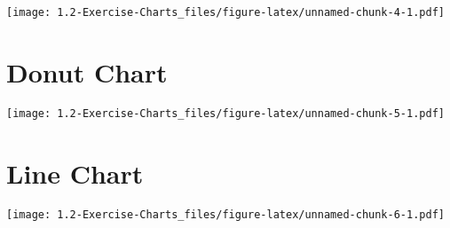 \documentclass[
]{article}
\begin{document}
\texttt{[image: 1.2-Exercise-Charts\_files/figure-latex/unnamed-chunk-4-1.pdf]}

\hypertarget{donut-chart}{%
\section{Donut Chart}\label{donut-chart}}

\texttt{[image: 1.2-Exercise-Charts\_files/figure-latex/unnamed-chunk-5-1.pdf]}

\hypertarget{line-chart}{%
\section{Line Chart}\label{line-chart}}

\texttt{[image: 1.2-Exercise-Charts\_files/figure-latex/unnamed-chunk-6-1.pdf]}
\end{document}
